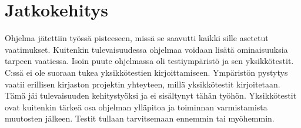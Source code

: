 \section{Jatkokehitys}
Ohjelma jätettiin työssä pisteeseen, missä se saavutti kaikki sille asetetut vaatimukset. Kuitenkin tulevaisuudessa ohjelmaa voidaan lisätä ominaisuuksia tarpeen vaatiessa. Isoin puute ohjelmassa oli testiympäristö ja sen yksikkötestit. C:ssä ei ole suoraan tukea yksikkötestien kirjoittamiseen. Ympäristön pystytys vaatii erillisen kirjaston projektin yhteyteen, millä yksikkötestit kirjoitetaan. Tämä jäi tulevaisuuden kehitystyöksi ja ei sisältynyt tähän työhön. Yksikkötestit ovat kuitenkin tärkeä osa ohjelman ylläpitoa ja toiminnan varmistamista muutosten jälkeen. Testit tullaan tarvitsemaan ennemmin tai myöhemmin.